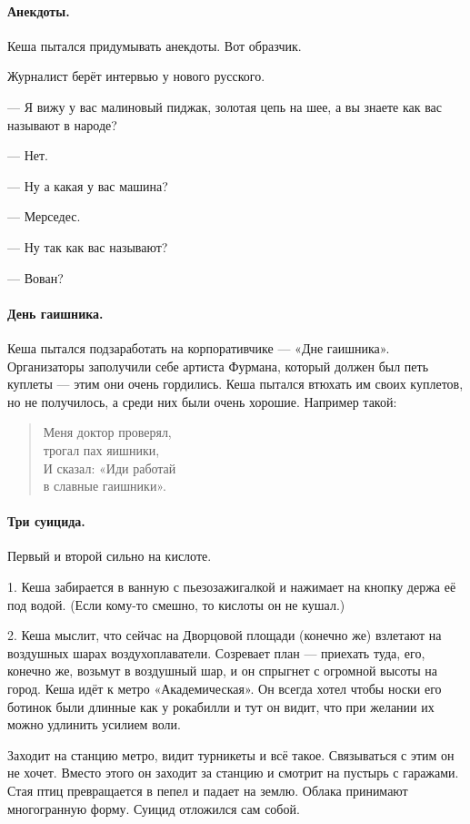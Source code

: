 \documentclass{book}
\begin{document}
\paragraph{Анекдоты.}
Кеша пытался придумывать анекдоты.
Вот образчик.

Журналист берёт интервью у нового русского.

--- Я вижу у вас малиновый пиджак, золотая цепь на шее, а вы знаете как вас называют в народе?

--- Нет.

--- Ну а какая у вас машина?

--- Мерседес.

--- Ну так как вас называют?

--- Вован?


\paragraph{День гаишника.}
Кеша пытался подзаработать на корпоративчике --- «Дне гаишника».
Организаторы заполучили себе артиста Фурмана, который должен был петь куплеты --- этим они очень гордились.
Кеша пытался втюхать им своих куплетов, но не получилось, а среди них были очень хорошие.
Например такой:

\begin{verse}
Меня доктор проверял,\\
\quad  трогал пах яишники,\\
И сказал: «Иди работай\\
\quad в славные гаишники».
\end{verse}


\paragraph{Три суицида.}
Первый и второй сильно на кислоте.

1. Кеша забирается в ванную с пьезозажигалкой и нажимает на кнопку держа её под водой.
(Если кому-то смешно, то кислоты он не кушал.)

2. Кеша мыслит, что сейчас на Дворцовой площади (конечно же) взлетают на воздушных шарах воздухоплаватели.
Созревает план --- приехать туда, его, конечно же, возьмут в воздушный шар, и он спрыгнет с огромной высоты на город.
Кеша идёт к метро «Академическая».
Он всегда хотел чтобы носки его ботинок были длинные как у рокабилли и тут он видит, что при желании их можно удлинить усилием воли.

Заходит на станцию метро, видит турникеты и всё такое.
Связываться с этим он не хочет.
Вместо этого он заходит за станцию и смотрит на пустырь с гаражами.
Стая птиц превращается в пепел и падает на землю.
Облака принимают многогранную форму.
Суицид отложился сам собой.
\end{document}
